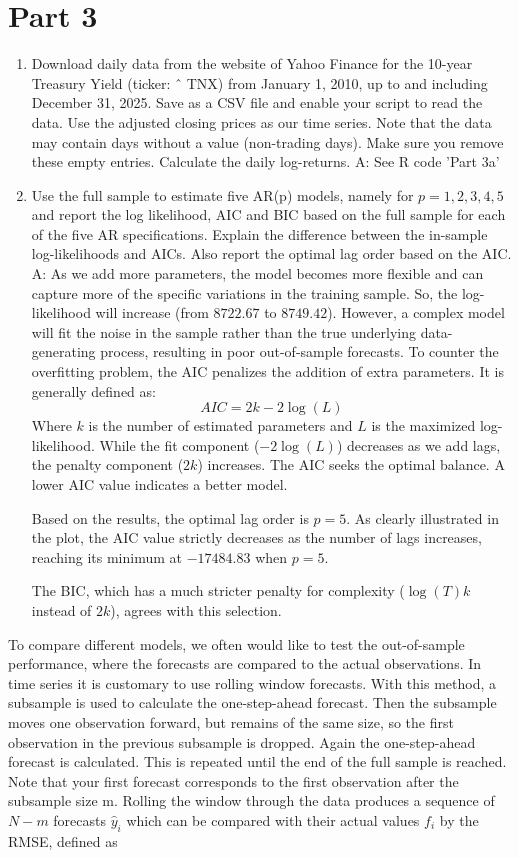 \documentclass{article}
\begin{document}
\section*{Part 3}
\begin{enumerate}
    \item [(a)] Download daily data from the website of Yahoo Finance for the 10-year Treasury Yield (ticker: ˆ TNX) from January 1, 2010, up to and including December 31, 2025. Save as a CSV file and enable your script to read the data. Use the adjusted closing prices as our time series. Note that the data may contain days without a value (non-trading days). Make sure you remove these empty entries. Calculate the daily log-returns.
    \newline \newline
    A: See R code 'Part 3a'
    \item[(b)] Use the full sample to estimate five AR(p) models, namely for $p = 1,2,3,4,5$ and report the log likelihood, AIC and BIC based on the full sample for each of the five AR specifications. Explain the difference between the in-sample log-likelihoods and AICs. Also report the optimal lag order based on the AIC.
    \newline \newline
    A: As we add more parameters, the model becomes more flexible and can capture more of the specific variations in the training sample. So, the log-likelihood will increase (from $8722.67$ to $8749.42$). However, a complex model will fit the noise in the sample rather than the true underlying data-generating process, resulting in poor out-of-sample forecasts. To counter the overfitting problem, the AIC penalizes the addition of extra parameters. It is generally defined as:
    $$AIC = 2k - 2\log(L)$$
    Where $k$ is the number of estimated parameters and $L$ is the maximized log-likelihood. While the fit component ($-2\log(L)$) decreases as we add lags, the penalty component ($2k$) increases. The AIC seeks the optimal balance. A lower AIC value indicates a better model.
    
    Based on the results, the optimal lag order is $p = 5$. As clearly illustrated in the plot, the AIC value strictly decreases as the number of lags increases, reaching its minimum at $-17484.83$ when $p = 5$.
    
    The BIC, which has a much stricter penalty for complexity ($\log(T)k$ instead of $2k$), agrees with this selection.
\end{enumerate}
\newpage
To compare different models, we often would like to test the out-of-sample performance, where the forecasts are compared to the actual observations. In time series it is customary to use rolling window forecasts. With this method, a subsample is used to calculate the one-step-ahead forecast. Then the subsample moves one observation forward, but remains of the same size, so the first observation in the previous subsample is dropped. Again the one-step-ahead forecast is calculated. This is repeated until the end of the full sample is reached. Note that your first forecast corresponds to the first observation after the subsample size m. Rolling the window through the data produces a sequence of $N-m$ forecasts $\hat{y}_i$ which can be compared with their actual values $f_i$ by the RMSE, defined as
\end{document}
